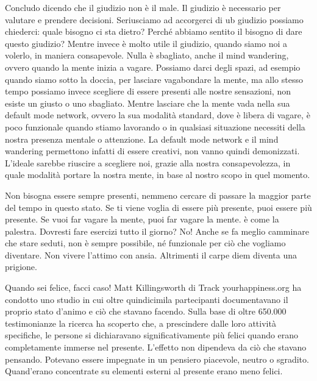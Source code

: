\documentclass[12pt]{book} %
\begin{document}
Concludo dicendo che il giudizio non è il male. Il giudizio è necessario per valutare e prendere decisioni. Seriusciamo ad accorgerci di ub giudizio possiamo chiederci: quale bisogno ci sta dietro?
Perché abbiamo sentito il bisogno di dare questo giudizio? Mentre invece è molto utile il giudizio, quando siamo noi a
volerlo, in maniera consapevole.
Nulla è sbagliato, anche il mind wandering, ovvero quando la mente inizia a vagare. Possiamo darci degli spazi, ad
esempio quando siamo sotto la doccia, per lasciare vagabondare la mente, ma allo stesso tempo possiamo invece scegliere
di essere presenti alle nostre sensazioni, non esiste un giusto o uno sbagliato. Mentre lasciare che la mente vada
nella sua default mode network, ovvero la sua modalità standard, dove è libera di vagare, è poco funzionale quando
stiamo lavorando o in qualsiasi situazione necessiti della nostra presenza mentale o attenzione. 
La default mode network e il mind wandering permettono infatti di essere creativi, non vanno quindi
demonizzati.
L'ideale sarebbe riuscire a scegliere noi, grazie alla nostra consapevolezza, in quale modalità
portare la nostra mente, in base al nostro scopo in quel momento.

Non bisogna essere sempre presenti, nemmeno cercare di passare la maggior parte del tempo in questo stato. Se ti viene
voglia di essere più presente, puoi essere più presente. Se vuoi far vagare la mente, puoi far vagare la mente. è come
la palestra. Dovresti fare esercizi tutto il giorno? No! Anche se fa meglio camminare che stare seduti, non è sempre
possibile, né funzionale per ciò che vogliamo diventare. Non vivere l'attimo con ansia. Altrimenti il carpe diem diventa una prigione.

Quando sei felice, facci caso!
Matt Killingsworth di Track yourhappiness.org ha condotto uno studio in cui oltre quindicimila partecipanti
documentavano il proprio stato d'animo e ciò che stavano facendo. Sulla base di oltre 650.000
testimonianze la ricerca ha scoperto che, a prescindere dalle loro attività specifiche, le persone si dichiaravano
significativamente più felici quando erano completamente immerse nel presente. L'effetto non
dipendeva da ciò che stavano pensando. Potevano essere impegnate in un pensiero piacevole, neutro o sgradito.
Quand'erano concentrate su elementi esterni al presente erano meno felici. 
\end{document}
